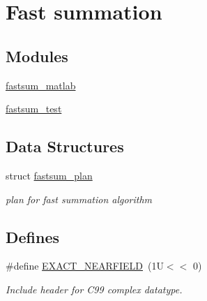 \hypertarget{group__applications__fastsum}{
\section{Fast summation}
\label{group__applications__fastsum}
}
\subsection*{Modules}
\begin{CompactItemize}
\item 
\hyperlink{group__applications__fastsum__matlab}{fastsum\_\-matlab}
\item 
\hyperlink{group__applications__fastsum__test}{fastsum\_\-test}
\end{CompactItemize}
\subsection*{Data Structures}
\begin{CompactItemize}
\item 
struct \hyperlink{structfastsum__plan}{fastsum\_\-plan}
\begin{CompactList}\small\item\em plan for fast summation algorithm \item\end{CompactList}\end{CompactItemize}
\subsection*{Defines}
\begin{CompactItemize}
\item 
\#define \hyperlink{group__applications__fastsum_gc22376cb30edef9131c592a355d1030d}{EXACT\_\-NEARFIELD}~(1U$<$$<$ 0)
\begin{CompactList}\small\item\em Include header for C99 complex datatype. \item\end{CompactList}\end{CompactItemize}
